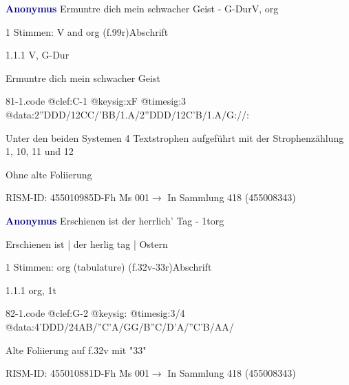 \documentclass[twocolumn]{book}
\begin{document}
\par \vspace{7pt} \textcolor{darkblue}{\textbf{Anonymus  }}\hfillplus{\textbf{[81]}}\newline Ermuntre dich mein schwacher Geist - G-Dur\newline V, org
\par \begin{itshape}\end{itshape} 
\par \textcolor{darkblue}{}  1 Stimmen: V and org  (f.99r)\newline Abschrift
\par 1.1.1  V, G-Dur\newline \begin{footnotesize} Ermuntre dich mein schwacher Geist \end{footnotesize}  
\begin{filecontents*}{81-1.code}
@clef:C-1
@keysig:xF
@timesig:3
@data:2''DDD/12CC/'BB/1.A/2''DDD/12C'B/1.A/G://:
\end{filecontents*}
\newline
%
\par Unter den beiden Systemen 4 Textstrophen aufgeführt mit der Strophenzählung 1, 10, 11 und 12
\par Ohne alte Foliierung
\par RISM-ID: 455010985\newline D-Fh  Ms 001\newline $\rightarrow$ In Sammlung 418 (455008343)
      
\par \vspace{7pt} \textcolor{darkblue}{\textbf{Anonymus  }}\hfillplus{\textbf{[82]}}\newline Erschienen ist der herrlich' Tag - 1t\newline org
\par \begin{itshape}[f.32v, at left:] Erschienen ist | der herlig tag | Ostern\end{itshape} 
\par \textcolor{darkblue}{}  1 Stimmen: org (tabulature)  (f.32v-33r)\newline Abschrift
\par 1.1.1  org, 1t  
\begin{filecontents*}{82-1.code}
@clef:G-2
@keysig:
@timesig:3/4
@data:4'DDD/24AB/''C'A/GG/B''C/D'A/''C'B/AA/
\end{filecontents*}
\newline
%
\par Alte Foliierung auf f.32v mit "33"
\par RISM-ID: 455010881\newline D-Fh  Ms 001\newline $\rightarrow$ In Sammlung 418 (455008343)
      
\end{document}
